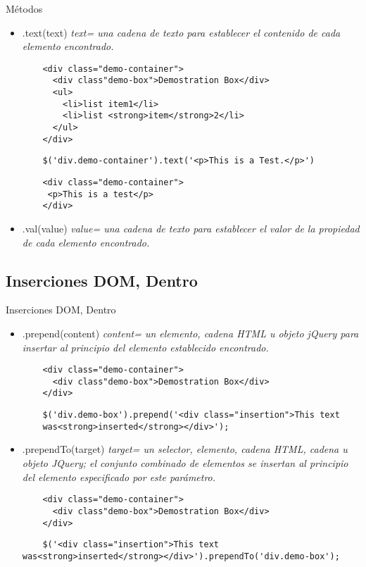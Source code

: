 \begin{frame}[fragile]{Métodos} %
\begin{itemize}
    \item .text(text) \textit{ text= una cadena de texto para establecer el contenido de cada elemento encontrado.} 
    \begin{lstlisting}
    <div class="demo-container">
      <div class"demo-box">Demostration Box</div>
      <ul>
        <li>list item1</li>
        <li>list <strong>item</strong>2</li>
      </ul>
    </div>
    \end{lstlisting}
    \begin{lstlisting}
    $('div.demo-container').text('<p>This is a Test.</p>')
    \end{lstlisting}
    \begin{lstlisting}
    <div class="demo-container">
     <p>This is a test</p>
    </div>
    \end{lstlisting}
    \item .val(value) \textit{ value= una cadena de texto para establecer el valor de la propiedad de cada elemento encontrado.}
\end{itemize}
\end{frame}

\subsection{Inserciones DOM, Dentro} %

\begin{frame}[fragile]{Inserciones DOM, Dentro} %
\begin{itemize}
    \item .prepend(content) \textit{ content= un elemento, cadena HTML u objeto
    jQuery para insertar al principio del elemento establecido encontrado.} 
    \begin{lstlisting}
    <div class="demo-container">
      <div class"demo-box">Demostration Box</div>
    </div>
    \end{lstlisting}
    \begin{lstlisting}
    $('div.demo-box').prepend('<div class="insertion">This text
    was<strong>inserted</strong></div>');
    \end{lstlisting}
    \item .prependTo(target) \textit{ target= un selector, elemento, cadena
    HTML, cadena u objeto JQuery; el conjunto combinado de elementos se
    insertan al principio del elemento especificado por este parámetro.} 
    \begin{lstlisting}
    <div class="demo-container">
      <div class"demo-box">Demostration Box</div>
    </div>
    \end{lstlisting}
    \begin{lstlisting}
    $('<div class="insertion">This text was<strong>inserted</strong></div>').prependTo('div.demo-box');
    \end{lstlisting}
\end{itemize}
\end{frame}

